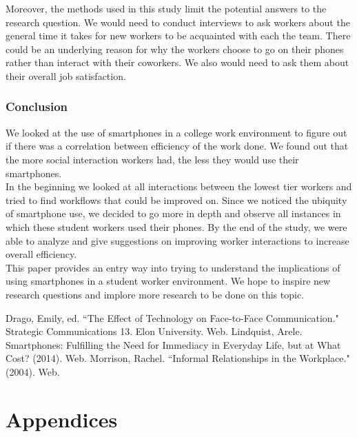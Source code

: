 \documentclass[letterpaper, 12pt]{report}
\begin{document}
	Moreover, the methods used in this study limit the potential answers to the research question. We would need to conduct interviews to ask workers about the general time it takes for new workers to be acquainted with each the team. There could be an underlying reason for why the workers choose to go on their phones rather than interact with their coworkers. We also would need to ask them about their overall job satisfaction.
	
	\section{Conclusion}
	We looked at the use of smartphones in a college work environment to figure out if there was a correlation between efficiency of the work done. We found out that the more social interaction workers had, the less they would use their smartphones.\\
	
	In the beginning we looked at all interactions between the lowest tier workers and tried to find workflows that could be improved on. Since we noticed the ubiquity of smartphone use, we decided to go more in depth and observe all instances in which these student workers used their phones. By the end of the study, we were able to analyze and give suggestions on improving worker interactions to increase overall efficiency.\\
	
	This paper provides an entry way into trying to understand the implications of using smartphones in a student worker environment. We hope to inspire new research questions and implore more research to be done on this topic.
	\clearpage
	\begin{thebibliography}{3}
		Drago, Emily, ed. ``The Effect of Technology on Face-to-Face Communication." Strategic Communications 13. Elon University. Web.
		Lindquist, Arele. Smartphones: Fulfilling the Need for Immediacy in Everyday Life, but at What Cost? (2014). Web.
		Morrison, Rachel. ``Informal Relationships in the Workplace." (2004). Web.
	\end{thebibliography}
	
	

\part{Appendices}
\end{document}
